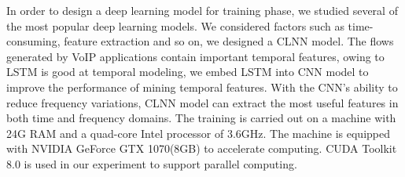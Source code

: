 \documentclass[conference]{IEEEtran}
\begin{document}

In order to design a deep learning model for training phase, we studied several of the most popular deep learning models. We considered factors such as time-consuming, feature extraction and so on, we designed a CLNN model. The flows generated by VoIP applications contain important temporal features, owing to LSTM is good at temporal modeling, we embed LSTM into CNN model to improve the performance of mining temporal features. With the CNN's ability to reduce frequency variations, CLNN model can extract the most useful features in both time and frequency domains. The training is carried out on a machine with 24G RAM and a quad-core Intel processor of 3.6GHz. The machine is equipped with NVIDIA GeForce GTX 1070(8GB) to accelerate computing. CUDA Toolkit 8.0 is used in our experiment to support parallel computing.

\end{document}
